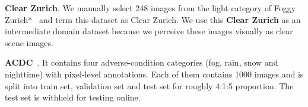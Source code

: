 \documentclass[10pt,twocolumn,letterpaper]{article}
\begin{document}
\noindent\textbf{Clear Zurich}. We manually select 248 images from the light category of Foggy Zurich*~\cite{sakaridis2018model} and term this dataset as Clear Zurich. We use this \textbf{Clear Zurich} as an intermediate domain dataset because we perceive these images visually as clear scene images.
 
\noindent\textbf{ACDC}~\cite{ACDC}. It contains four adverse-condition categories (fog, rain, snow and nighttime) with pixel-level annotations. Each of them contains 1000 images and is split into train set, validation set and test set for roughly 4:1:5 proportion. The test set is withheld for testing online. 
\end{document}
